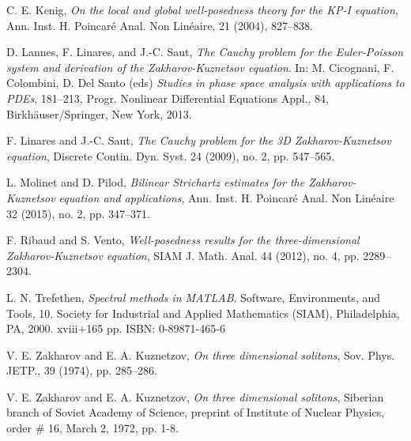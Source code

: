 \documentclass[12pt,letterpaper]{amsart}
\theoremstyle{remark}
\numberwithin{equation}{section}
\numberwithin{theorem}{section}
\numberwithin{table}{section}
\begin{document}
\begin{thebibliography}{99}
C. E. Kenig, 
\emph{On the local and global well-posedness theory for the KP-I equation}, 
Ann. Inst. H. Poincar\'e Anal. Non Lin\'eaire, 21 (2004), 827--838.

D. Lannes, F. Linares, and J.-C. Saut, 
\emph{The Cauchy problem for the Euler-Poisson system and derivation of the Zakharov-Kuznetsov equation}.   In: M. Cicognani, F. Colombini, D. Del Santo (eds) \emph{Studies in phase space analysis with applications to PDEs}, 181--213, Progr. Nonlinear Differential Equations Appl., 84, Birkh\"auser/Springer, New York, 2013.

F. Linares and J.-C. Saut, 
\emph{The Cauchy problem for the 3D Zakharov-Kuznetsov equation}, 
Discrete Contin. Dyn. Syst. 24 (2009), no. 2, pp. 547--565. 

L. Molinet and D. Pilod, 
\emph{Bilinear Strichartz estimates for the Zakharov-Kuznetsov equation and applications}, 
Ann. Inst. H. Poincar\'e Anal. Non Lin\'eaire 32 (2015), no. 2, pp. 347--371. 

F. Ribaud  and  S. Vento, 
\emph{Well-posedness results for the three-dimensional Zakharov-Kuznetsov equation}, 
SIAM J. Math. Anal. 44 (2012), no. 4, pp. 2289--2304.   

L. N. Trefethen, 
\emph{Spectral methods in MATLAB}. Software, Environments, and Tools, 10. 
Society for Industrial and Applied Mathematics (SIAM), Philadelphia, PA, 2000. xviii+165 pp. ISBN: 0-89871-465-6 

V. E. Zakharov and E. A. Kuznetzov, 
\emph{On three dimensional solitons}, 
Sov. Phys. JETP., 39 (1974), pp. 285--286.

V. E. Zakharov and E. A. Kuznetzov, 
\emph{On three dimensional solitons}, 
Siberian branch of Soviet Academy of Science, preprint of Institute of Nuclear Physics, order \# 16, March 2, 1972, pp. 1-8.

\end{thebibliography}
\end{document}

